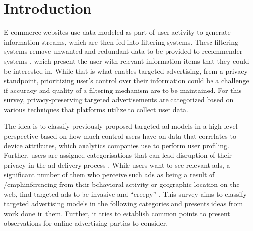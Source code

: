 \documentclass[sigconf,nonacm]{acmart}
\begin{document}
\section{Introduction}
E-commerce websites use data modeled as part of user activity to generate information streams, which are then fed into filtering systems. These filtering systems remove unwanted and redundant data to be provided to recommender systems \cite{One}, which present the user with relevant information items that they could be interested in. While that is what enables targeted advertising, from a privacy standpoint, prioritizing user’s control over their information could be a challenge if accuracy and quality of a filtering mechanism are to be maintained. For this survey, privacy-preserving targeted advertisements are categorized based on various techniques that platforms utilize to collect user data.

The idea is to classify previously-proposed targeted ad models in a high-level perspective based on how much control users have on data that correlates to device attributes, which analytics companies use to perform user profiling. Further, users are assigned categorisations that can lead disruption of their privacy in the ad delivery process \cite{Korolova}. While users want to see relevant ads, a significant number of them who perceive such ads as being a result of /emph{inferencing} from their behavioral activity or geographic location on the web, find targeted ads to be invasive and “creepy” \cite{One}. This survey aims to classify targeted advertising models in the following categories and presents ideas from work done in them. Further, it tries to establish common points to present observations for online advertising parties to consider.
\end{document}
